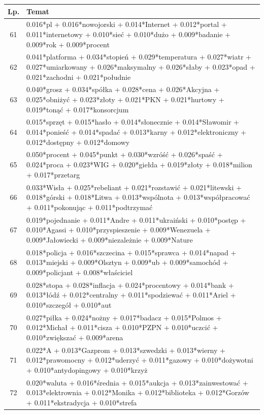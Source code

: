 \documentclass[11pt,a4paper]{article}
\begin{document}
\begin{table}[h]
\begin{tabular}{|c|>{\footnotesize}p{\linewidth}|}
\hline
Lp. & Temat \\\hline

61 & 0.016*pl + 0.016*nowojorski + 0.014*Internet + 0.012*portal + 0.011*internetowy + 0.010*sieć + 0.010*dużo + 0.009*badanie + 0.009*rok + 0.009*procent\\\hline
62 & 0.041*platforma + 0.034*stopień + 0.029*temperatura + 0.027*wiatr + 0.027*umiarkowany + 0.026*maksymalny + 0.026*słaby + 0.023*opad + 0.021*zachodni + 0.021*południe\\\hline
63 & 0.040*grosz + 0.034*spółka + 0.028*cena + 0.026*Akcyjna + 0.025*obniżyć + 0.023*złoty + 0.021*PKN + 0.021*hurtowy + 0.019*tonąć + 0.017*konsorcjum\\\hline
64 & 0.015*sprzęt + 0.015*hasło + 0.014*słonecznie + 0.014*Sławomir + 0.014*ponieść + 0.014*spadać + 0.013*karny + 0.012*elektroniczny + 0.012*dostępny + 0.012*domowy\\\hline
65 & 0.050*procent + 0.045*punkt + 0.030*wzróść + 0.026*spaść + 0.024*proca + 0.023*WIG + 0.020*giełda + 0.019*złoty + 0.018*milion + 0.017*przetarg\\\hline
66 & 0.033*Wisła + 0.025*rebeliant + 0.021*rozstawić + 0.021*litewski + 0.018*górski + 0.018*Litwa + 0.013*wspólnota + 0.013*współpracować + 0.011*pokonując + 0.011*podtrzymać\\\hline
67 & 0.019*pojednanie + 0.011*Andre + 0.011*ukraiński + 0.010*postęp + 0.010*Agassi + 0.010*przyspieszenie + 0.009*Wenezuela + 0.009*Jałowiecki + 0.009*niezależnie + 0.009*Nature\\\hline
68 & 0.018*policja + 0.016*szczecina + 0.015*sprawca + 0.014*napad + 0.013*miejski + 0.009*Olsztyn + 0.009*ub + 0.009*samochód + 0.009*policjant + 0.008*właściciel\\\hline
69 & 0.028*stopa + 0.028*inflacja + 0.024*procentowy + 0.014*bank + 0.013*łódź + 0.012*centralny + 0.011*spodziewać + 0.011*Ariel + 0.010*szczegół + 0.010*aut\\\hline
70 & 0.027*piłka + 0.024*nożny + 0.017*badacz + 0.015*Polmos + 0.012*Michał + 0.011*cisza + 0.010*PZPN + 0.010*uczcić + 0.010*zwiększać + 0.009*arena\\\hline
71 & 0.022*A + 0.013*Gazprom + 0.013*szwedzki + 0.013*wierny + 0.012*prawomocny + 0.012*uderzyć + 0.011*gazowy + 0.010*dożywotni + 0.010*antydopingowy + 0.010*krzyż\\\hline
72 & 0.020*waluta + 0.016*średnia + 0.015*aukcja + 0.013*zainwestować + 0.013*elektrownia + 0.012*Monika + 0.012*biblioteka + 0.012*Gorzów + 0.011*ekstradycja + 0.010*strefa\\\hline

\end{tabular}
\end{table}
\end{document}
